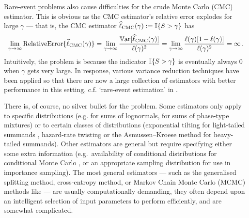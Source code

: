 Rare-event problems also cause difficulties for the crude Monte Carlo (CMC) estimator. This is obvious as the CMC estimator's relative error explodes for large $\gamma$ --- that is, the CMC estimator $\widehat{\ell}_{\text{CMC}}(\gamma) := \mathbb{I}\{ S > \gamma \}$ has
\[ \lim_{\gamma \to \infty} \text{RelativeError}\{ \widehat{\ell}_{\text{CMC}}(\gamma) \} = \lim_{\gamma \to \infty} \frac{ \operatorname{\mathbb{V}\mathrm{ar}}[ \widehat{\ell}_{\text{CMC}}(\gamma) ] }{ \ell(\gamma)^2 } = \lim_{\gamma \to \infty} \frac{  \ell(\gamma)[1-\ell(\gamma)] }{  \ell(\gamma)^2 } = \infty \,. \]
Intuitively, the problem is because the indicator $\mathbb{I}\{ S > \gamma \}$ is eventually always 0 when $\gamma$ gets very large. In response, various variance reduction techniques have been applied so that there are now a large collection of estimators with better performance in this setting, c.f. `rare-event estimation' in \cite{kroese2013handbook,asmussen2007stochastic,glasserman2003monte}.

There is, of course, no silver bullet for the problem. Some estimators only apply to specific distributions (e.g. \cite{botev2017fast} for sums of lognormals, \cite{yao2016estimating} for sums of phase-type mixtures) or to certain classes of distributions (exponential tilting for light-tailed summands \cite{kroese2013handbook,asmussen2007stochastic}, hazard-rate twisting or the Asmussen--Kroese method \cite{asmussen2006improved} for heavy-tailed summands). Other estimators are general but require specifying either some extra information (e.g.\ availability of conditional distributions for conditional Monte Carlo \cite{asmussen2017conditional}, or an appropriate sampling distribution for use in importance sampling). The most general estimators --- such as the generalised splitting method, cross-entropy method, or Markov Chain Monte Carlo (MCMC) methods like \cite{chan2012improved} --- are usually computationally demanding, they often depend upon an intelligent selection of input parameters to perform efficiently, and are somewhat complicated.

